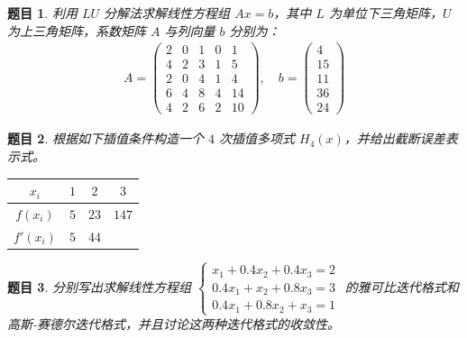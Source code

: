 \documentclass[12pt,a4paper]{article}
\newtheorem{problem}{题目}
\newcommand{\largeanswer}{\newpage\vspace*{0.5cm}\vspace{0.5cm}}
\begin{document}
    \begin{problem}
        利用 $LU$ 分解法求解线性方程组 $Ax = b$，其中 $L$ 为单位下三角矩阵，$U$ 为上三角矩阵，系数矩阵 $A$ 与列向量 $b$ 分别为：
        \begin{align*}
            A = \begin{pmatrix} 2 & 0 & 1 & 0 & 1 \\ 4 & 2 & 3 & 1 & 5 \\ 2 & 0 & 4 & 1 & 4 \\ 6 & 4 & 8 & 4 & 14 \\ 4 & 2 & 6 & 2 & 10 \end{pmatrix}, \quad b = \begin{pmatrix} 4 \\ 15 \\ 11 \\ 36 \\ 24 \end{pmatrix}
        \end{align*}
    \end{problem}
    
    \largeanswer
    
    \begin{problem}
        根据如下插值条件构造一个 $4$ 次插值多项式 $H_4(x)$，并给出截断误差表示式。
        
        \begin{center}
            \begin{tabular}{|c|c|c|c|}
                \hline
                $x_i$ & $1$ & $2$ & $3$ \\
                \hline
                $f(x_i)$ & $5$ & $23$ & $147$ \\
                \hline
                $f'(x_i)$ & $5$ & $44$ & \quad \\
                \hline
            \end{tabular}
        \end{center}
    \end{problem}
    
    \largeanswer
    
    \begin{problem}
        分别写出求解线性方程组 
        $\begin{cases} 
            x_1 + 0.4x_2 + 0.4x_3 = 2 \\
            0.4x_1 + x_2 + 0.8x_3 = 3 \\
            0.4x_1 + 0.8x_2 + x_3 = 1
        \end{cases}$
        的雅可比迭代格式和高斯-赛德尔迭代格式，并且讨论这两种迭代格式的收敛性。
    \end{problem}
    
\end{document}
